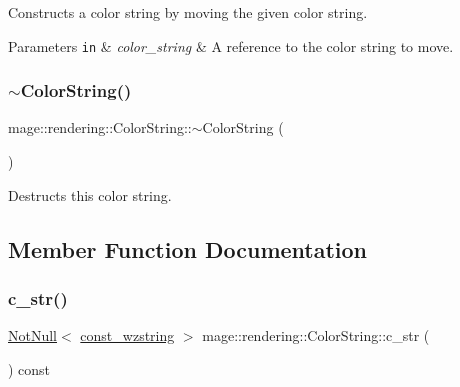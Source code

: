 Constructs a color string by moving the given color string.


\begin{DoxyParams}[1]{Parameters}
\mbox{\tt in}  & {\em color\+\_\+string} & A reference to the color string to move. \\
\hline
\end{DoxyParams}
\mbox{\label{classmage_1_1rendering_1_1_color_string_a13ab2218e1cbe99241283214e455f3c9}} 
\subsubsection{\texorpdfstring{$\sim$\+Color\+String()}{~ColorString()}}
{\footnotesize\ttfamily mage\+::rendering\+::\+Color\+String\+::$\sim$\+Color\+String (\begin{DoxyParamCaption}{ }\end{DoxyParamCaption})\hspace{0.3cm}{\ttfamily [default]}}

Destructs this color string. 

\subsection{Member Function Documentation}
\mbox{\label{classmage_1_1rendering_1_1_color_string_a2706724097d2ad5c187d34db49d86bda}} 
\subsubsection{\texorpdfstring{c\+\_\+str()}{c\_str()}}
{\footnotesize\ttfamily \mbox{\hyperlink{namespacemage_a8769f9d670d6b585ea306cb1062af94b}{Not\+Null}}$<$ \mbox{\hyperlink{namespacemage_ac409e0f2a22292a3a4cd42742994fbf0}{const\+\_\+wzstring}} $>$ mage\+::rendering\+::\+Color\+String\+::c\+\_\+str (\begin{DoxyParamCaption}{ }\end{DoxyParamCaption}) const\hspace{0.3cm}{\ttfamily [noexcept]}}

